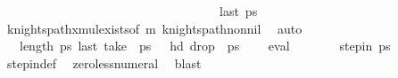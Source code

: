 \begin{isabellebody}
\ \ \ \ \ \ \ \ \ \ \ \ \ \ \ \ \ \ \ \ \ \ \ \ \ \ \ \ \ \ \ \ \ \ \ {\isachardoublequoteopen}last\ ps\ {\isacharequal}{\kern0pt}\ {\isacharparenleft}{\kern0pt}{}{\isacharcomma}{\kern0pt}{}{\isacharparenright}{\kern0pt}{\isachardoublequoteclose}\isanewline
\ \ \ \ \ \ \isamarkupfalse%
\ knights{\isacharunderscore}{\kern0pt}path{\isacharunderscore}{\kern0pt}{}xm{\isacharunderscore}{\kern0pt}ul{\isacharunderscore}{\kern0pt}exists{\isacharbrackleft}{\kern0pt}of\ {\isachardoublequoteopen}{\isacharparenleft}{\kern0pt}m{\isacharminus}{\kern0pt}{}{\isacharparenright}{\kern0pt}{\isachardoublequoteclose}{\isacharbrackright}{\kern0pt}\ knights{\isacharunderscore}{\kern0pt}path{\isacharunderscore}{\kern0pt}non{\isacharunderscore}{\kern0pt}nil\ \isamarkupfalse%
\ auto\isanewline
\isanewline
\ \ \ \ \isamarkupfalse%
\ {\isachardoublequoteopen}{}\ {\isacharless}{\kern0pt}\ length\ {\isacharquery}{\kern0pt}ps\ {\isachardoublequoteopen}last\ {\isacharparenleft}{\kern0pt}take\ {}\ {\isacharquery}{\kern0pt}ps\ {\isacharequal}{\kern0pt}\ {\isacharparenleft}{\kern0pt}{}{\isacharcomma}{\kern0pt}{}{\isacharparenright}{\kern0pt}{\isachardoublequoteclose}\ {\isachardoublequoteopen}hd\ {\isacharparenleft}{\kern0pt}drop\ {}\ {\isacharquery}{\kern0pt}ps\ {\isacharequal}{\kern0pt}\ {\isacharparenleft}{\kern0pt}{}{\isacharcomma}{\kern0pt}{}{\isacharparenright}{\kern0pt}{\isachardoublequoteclose}\ \isamarkupfalse%
\ eval{\isacharplus}{\kern0pt}\isanewline
\ \ \ \ \isamarkupfalse%
\ \isamarkupfalse%
\ {\isachardoublequoteopen}step{\isacharunderscore}{\kern0pt}in\ {\isacharquery}{\kern0pt}ps\ {\isacharparenleft}{\kern0pt}{}{\isacharcomma}{\kern0pt}{}{\isacharparenright}{\kern0pt}\ {\isacharparenleft}{\kern0pt}{}{\isacharcomma}{\kern0pt}{}{\isacharparenright}{\kern0pt}{\isachardoublequoteclose}\isanewline
\ \ \ \ \ \ \isamarkupfalse%
\ step{\isacharunderscore}{\kern0pt}in{\isacharunderscore}{\kern0pt}def\ \isamarkupfalse%
\ zero{\isacharunderscore}{\kern0pt}less{\isacharunderscore}{\kern0pt}numeral\ \isamarkupfalse%
\ blast\isanewline
\ \ \ \ \isamarkupfalse%

\end{isabellebody}
